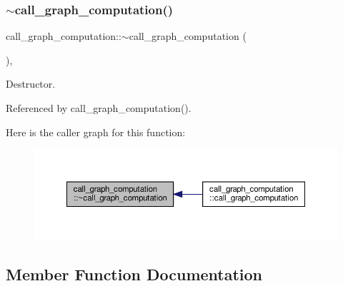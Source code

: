 \subsubsection{\texorpdfstring{$\sim$call\+\_\+graph\+\_\+computation()}{~call\_graph\_computation()}}
{\footnotesize\ttfamily call\+\_\+graph\+\_\+computation\+::$\sim$call\+\_\+graph\+\_\+computation (\begin{DoxyParamCaption}{ }\end{DoxyParamCaption})\hspace{0.3cm}{\ttfamily [override]}, {\ttfamily [default]}}



Destructor. 



Referenced by call\+\_\+graph\+\_\+computation().

Here is the caller graph for this function\+:
\nopagebreak
\begin{figure}[H]
\begin{center}
\leavevmode
\includegraphics[width=350pt]{d3/d6f/classcall__graph__computation_a47744b276b33fb2f3a223cad69a218ac_icgraph}
\end{center}
\end{figure}


\subsection{Member Function Documentation}
\mbox{\label{classcall__graph__computation_aa08581de981bf5549768d841274af95c}} 
